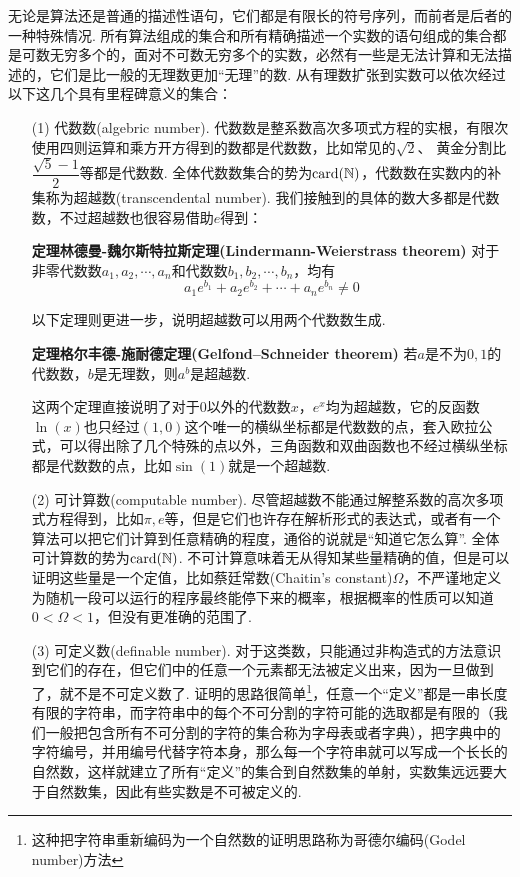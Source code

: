 \documentclass[UTF8]{ctexart}
\newcommand{\card}{{\rm card}}
\newenvironment{theorem}[1]
    {\begin{tcolorbox}[enhanced, colback=LightYellow, breakable=true, frame hidden, borderline west={1.5mm}{-2mm}{DarkBlue}]
    {\bfseries {\color{DarkBlue} 定理}\quad #1} \newline}
    {\end{tcolorbox}}
\begin{document}
无论是算法还是普通的描述性语句，它们都是有限长的符号序列，而前者是后者的一种特殊情况. 所有算法组成的集合和所有精确描述一个实数的语句组成的集合都是可数无穷多个的，面对不可数无穷多个的实数，必然有一些是无法计算和无法描述的，它们是比一般的无理数更加“无理”的数. 从有理数扩张到实数可以依次经过以下这几个具有里程碑意义的集合：
\begin{itemize}
    \item [(1)]
    代数数(algebric number). 代数数是整系数高次多项式方程的实根，有限次使用四则运算和乘方开方得到的数都是代数数，比如常见的\(\sqrt2\)、 黄金分割比\(\dfrac{\sqrt{5}-1}{2}\)等都是代数数. 全体代数数集合的势为\(\card(\mathbb{N})\)，代数数在实数内的补集称为超越数(transcendental number). 我们接触到的具体的数大多都是代数数，不过超越数也很容易借助\(e\)得到：
    \begin{theorem}{林德曼-魏尔斯特拉斯定理(Lindermann-Weierstrass theorem)}
        对于非零代数数\(a_1, a_2, \cdots, a_n\)和代数数\(b_1, b_2, \cdots, b_n\)，均有
        \[a_1e^{b_1}+a_2e^{b_2}+\cdots+a_ne^{b_n} \neq 0\]
    \end{theorem}
    以下定理则更进一步，说明超越数可以用两个代数数生成.
    \begin{theorem}{格尔丰德-施耐德定理(Gelfond–Schneider theorem)}
        若\(a\)是不为\(0,1\)的代数数，\(b\)是无理数，则\(a^b\)是超越数.
    \end{theorem}
    这两个定理直接说明了对于\(0\)以外的代数数\(x\)，\(e^x\)均为超越数，它的反函数\(\ln(x)\)也只经过\((1,0)\)这个唯一的横纵坐标都是代数数的点，套入欧拉公式，可以得出除了几个特殊的点以外，三角函数和双曲函数也不经过横纵坐标都是代数数的点，比如\(\sin(1)\)就是一个超越数.
\end{itemize}
\begin{itemize}
    \item[(2)]
    可计算数(computable number). 尽管超越数不能通过解整系数的高次多项式方程得到，比如\(\pi, e\)等，但是它们也许存在解析形式的表达式，或者有一个算法可以把它们计算到任意精确的程度，通俗的说就是“知道它怎么算”. 全体可计算数的势为\(\card(\mathbb{N})\). 不可计算意味着无从得知某些量精确的值，但是可以证明这些量是一个定值，比如蔡廷常数(Chaitin's constant)\(\Omega\)，不严谨地定义为随机一段可以运行的程序最终能停下来的概率，根据概率的性质可以知道\(0<\Omega<1\)，但没有更准确的范围了.
\end{itemize}
\begin{itemize}
    \item[(3)]
    可定义数(definable number). 对于这类数，只能通过非构造式的方法意识到它们的存在，但它们中的任意一个元素都无法被定义出来，因为一旦做到了，就不是不可定义数了. 证明的思路很简单\footnote{这种把字符串重新编码为一个自然数的证明思路称为哥德尔编码(Godel number)方法}，任意一个“定义”都是一串长度有限的字符串，而字符串中的每个不可分割的字符可能的选取都是有限的（我们一般把包含所有不可分割的字符的集合称为字母表或者字典），把字典中的字符编号，并用编号代替字符本身，那么每一个字符串就可以写成一个长长的自然数，这样就建立了所有“定义”的集合到自然数集的单射，实数集远远要大于自然数集，因此有些实数是不可被定义的.
\end{itemize}
\end{document}

